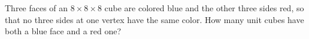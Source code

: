 \problem
Three faces of an $8 \times 8 \times 8$ cube are colored blue and the other
three sides red, so that no three sides at one vertex have the same color.
How many unit cubes have both a blue face and a red one?
\solution
\endproblem
